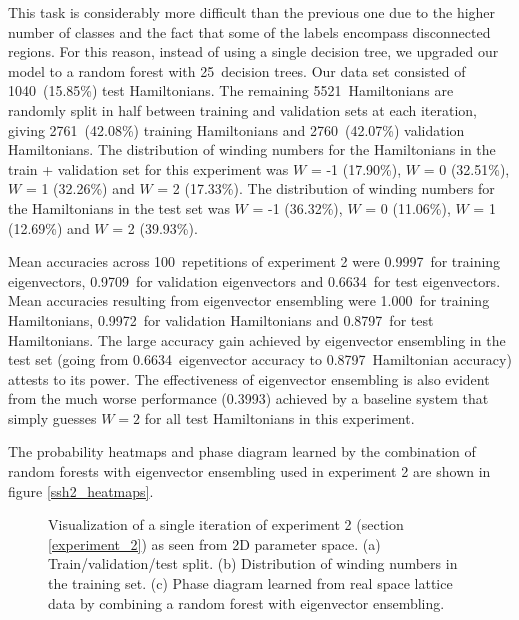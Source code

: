 \documentclass[10pt]{revtex4-1}
\newcommand\nExp{100}   %
\newcommand\nEst{25}   %
\newcommand\sshTwoTestNHam{1040}
\newcommand\sshTwoTestFracHam{15.85}
\newcommand\sshTwoTrainPlusValNHam{5521}
\newcommand\sshTwoTrainNHam{2761}
\newcommand\sshTwoTrainFracHam{42.08}
\newcommand\sshTwoValNHam{2760}
\newcommand\sshTwoValFracHam{42.07}
\newcommand\sshTwoTrainPlusValWindMinusOneFracHam{17.90}
\newcommand\sshTwoTrainPlusValWindZeroFracHam{32.51}
\newcommand\sshTwoTrainPlusValWindOneFracHam{32.26}
\newcommand\sshTwoTrainPlusValWindTwoFracHam{17.33}
\newcommand\sshTwoTestWindMinusOneFracHam{36.32}
\newcommand\sshTwoTestWindZeroFracHam{11.06}
\newcommand\sshTwoTestWindOneFracHam{12.69}
\newcommand\sshTwoTestWindTwoFracHam{39.93}
\newcommand\sshTwoHamTestBaseline{0.3993}
\newcommand\xTwoEigTrain{0.9997}
\newcommand\xTwoEigVal{0.9709}
\newcommand\xTwoEigTest{0.6634}
\newcommand\xTwoHamTrain{1.000}
\newcommand\xTwoHamVal{0.9972}
\newcommand\xTwoHamTest{0.8797}
\newcommand\SSHTwoTrainValTestSplit{./ssh2_scatter_train_val_test_experiment_0.png}
\newcommand\SSHTwoWindingTrain{./ssh2_scatter_winding_train_experiment_0.png}
\newcommand\SSHTwoPredictionGrid{./ssh2_pcolormesh_prediction_grid_experiment_0.png}
\begin{document}
This task is considerably more difficult than the previous one due to the higher number of classes and the fact that some of the labels encompass disconnected regions. For this reason, instead of using a single decision tree, we upgraded our model to a random forest \cite{Breiman2001} with \nEst\ decision trees. Our data set consisted of \sshTwoTestNHam\ (\sshTwoTestFracHam\%) test Hamiltonians. The remaining \sshTwoTrainPlusValNHam\ Hamiltonians are randomly split in half between training and validation sets at each iteration, giving \sshTwoTrainNHam\ (\sshTwoTrainFracHam\%) training Hamiltonians and \sshTwoValNHam\ (\sshTwoValFracHam\%) validation Hamiltonians. The distribution of winding numbers for the Hamiltonians in the train + validation set for this experiment was $W$ = -1 (\sshTwoTrainPlusValWindMinusOneFracHam\%), $W$ = 0 (\sshTwoTrainPlusValWindZeroFracHam\%), $W$ = 1 (\sshTwoTrainPlusValWindOneFracHam\%) and $W$ = 2 (\sshTwoTrainPlusValWindTwoFracHam\%). The distribution of winding numbers for the Hamiltonians in the test set was $W$ = -1 (\sshTwoTestWindMinusOneFracHam\%), $W$ = 0 (\sshTwoTestWindZeroFracHam\%), $W$ = 1 (\sshTwoTestWindOneFracHam\%) and $W$ = 2 (\sshTwoTestWindTwoFracHam\%).

Mean accuracies across \nExp\ repetitions of experiment 2 were \xTwoEigTrain\ for training eigenvectors, \xTwoEigVal\ for validation eigenvectors and \xTwoEigTest\ for test eigenvectors. Mean accuracies resulting from eigenvector ensembling were \xTwoHamTrain\ for training Hamiltonians, \xTwoHamVal\ for validation Hamiltonians and \xTwoHamTest\ for test Hamiltonians. The large accuracy gain achieved by eigenvector ensembling in the test set (going from \xTwoEigTest\ eigenvector accuracy to \xTwoHamTest\ Hamiltonian accuracy) attests to its power. The effectiveness of eigenvector ensembling is also evident from the much worse performance (\sshTwoHamTestBaseline) achieved by a baseline system that simply guesses $W=2$ for all test Hamiltonians in this experiment. 



The probability heatmaps and phase diagram learned by the combination of random forests with eigenvector ensembling used in experiment 2 are shown in figure \ref{ssh2_heatmaps}.

\begin{figure}
\centering
{}
\caption{Visualization of a single iteration of experiment 2 (section \ref{experiment_2}) as seen from 2D parameter space. (a) Train/validation/test split. (b) Distribution of winding numbers in the training set. (c) Phase diagram learned from real space lattice data by combining a random forest with eigenvector ensembling.}
\label{figexp2_exp}
\end{figure}
\end{document}
